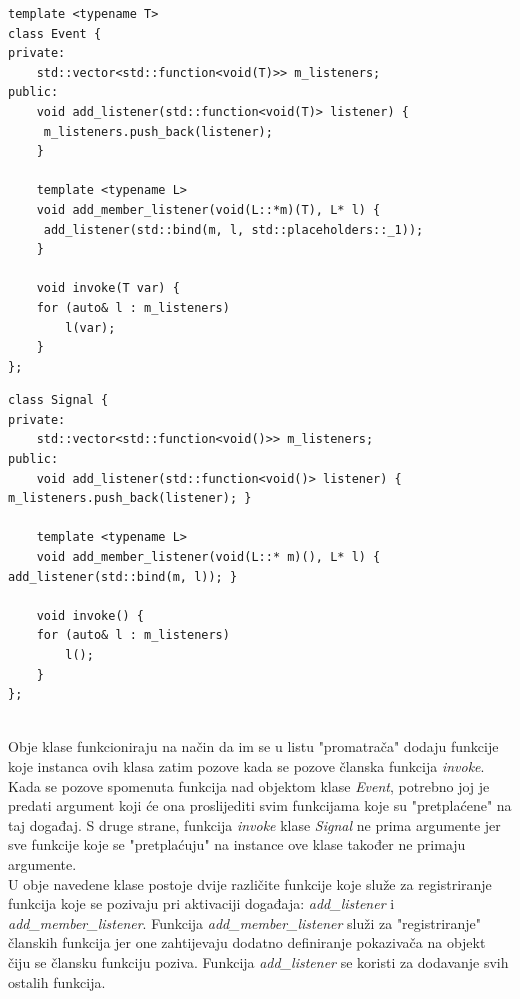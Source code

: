 \documentclass[times, utf8, diplomski]{fer}
\begin{document}
\begin{lstlisting}[caption={Klasa \textit{Event}},captionpos=b]
template <typename T>
class Event {
private:
	std::vector<std::function<void(T)>> m_listeners;
public:
	void add_listener(std::function<void(T)> listener) {
	 m_listeners.push_back(listener); 
	}
	
	template <typename L>
	void add_member_listener(void(L::*m)(T), L* l) {
	 add_listener(std::bind(m, l, std::placeholders::_1)); 
	}
	
	void invoke(T var) {
	for (auto& l : m_listeners)
		l(var);
	}
};
\end{lstlisting}

\begin{lstlisting}[caption={Klasa \textit{Signal}},captionpos=b]
class Signal {
private:
	std::vector<std::function<void()>> m_listeners;
public:
	void add_listener(std::function<void()> listener) { m_listeners.push_back(listener); }

	template <typename L>
	void add_member_listener(void(L::* m)(), L* l) { add_listener(std::bind(m, l)); }

	void invoke() {
	for (auto& l : m_listeners)
		l();
	}
};
\end{lstlisting}
\
\\

Obje klase funkcioniraju na način da im se u listu "promatrača" dodaju funkcije koje instanca ovih klasa zatim pozove kada se pozove članska funkcija \textit{invoke}. Kada se pozove spomenuta funkcija nad objektom klase \textit{Event}, potrebno joj je predati argument koji će ona proslijediti svim funkcijama koje su "pretplaćene" na taj događaj. S druge strane, funkcija \textit{invoke} klase \textit{Signal} ne prima argumente jer sve funkcije koje se "pretplaćuju" na instance ove klase također ne primaju argumente.\\

U obje navedene klase postoje dvije različite funkcije koje služe za registriranje funkcija koje se pozivaju pri aktivaciji događaja: \textit{add\_listener} i \textit{add\_member\_listener}. Funkcija \textit{add\_member\_listener} služi za "registriranje" članskih funkcija jer one zahtijevaju dodatno definiranje pokazivača na objekt čiju se člansku funkciju poziva. Funkcija \textit{add\_listener} se koristi za dodavanje svih ostalih funkcija.
\end{document}
